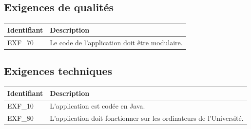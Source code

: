 \documentclass[hidelinks, 10pt,a4paper]{article}
\begin{document}
  \subsection{Exigences de qualités}
    \begin{center}
      \begin{tabular}{|l|p{10cm}|}
	\hline{\textbf{Identifiant}} & {\textbf{Description}}\\\hline
	{EXF\_70} & {Le code de l’application doit être modulaire.}\\\hline
      \end{tabular}
    \end{center}
  \subsection{Exigences techniques}
    \begin{center}
      \begin{tabular}{|l|p{10cm}|}
	\hline{\textbf{Identifiant}} & {\textbf{Description}}\\\hline
	{EXF\_10} & {L’application est codée en Java.}\\\hline
	{EXF\_80} & {L’application doit fonctionner sur les ordinateurs de l’Université.}\\\hline
      \end{tabular}
    \end{center}
\end{document}
